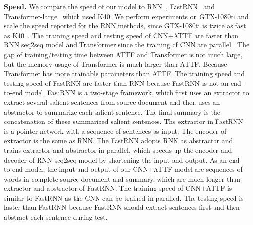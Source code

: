 

\textbf{Speed.} 
We compare the speed of our model to RNN~\citep{SeeLM17}, FastRNN~\citep{P18-1063} and Transformer-large~\citep{Attn17}
which used K40. 
We perform experiments on GTX-1080ti and scale the speed 
reported for the RNN methods,
since GTX-1080ti is twice as fast as K40~\citep{gehring2017convs2s}. 
The training speed and testing speed of CNN+ATTF 
are faster than RNN seq2seq model and Transformer
since the training of CNN are parallel .
The gap of training/testing time between ATTF and Transformer is not much large,
but the memory usage of Transformer is much larger than ATTF.
Because Transformer has more trainable parameters than ATTF.
The training speed and testing speed of FastRNN are faster than RNN
because FastRNN is not an end-to-end model. FastRNN is a two-stage framework, which first uses an extractor to extract several salient sentences from source document and then uses an abstractor to summarize each salient sentence. The final summary is the concatenation of these summarized salient sentences. The extractor in FastRNN is a pointer network with a sequence of sentences as input.
The encoder of extractor is the same as RNN. The FastRNN adopts RNN as abstractor and trains extractor and abstractor in parallel, which speeds up the encoder and decoder of RNN seq2seq model by shortening the input and output. As an end-to-end model, the input and output of our CNN+ATTF model are sequences of words in complete source document and summary, which are much longer than extractor and abstractor of FastRNN. The training speed of CNN+ATTF is similar to FastRNN as the CNN can be trained in paralled. The testing speed is faster than FastRNN because FastRNN should extract sentences first and then abstract each sentence during test.


